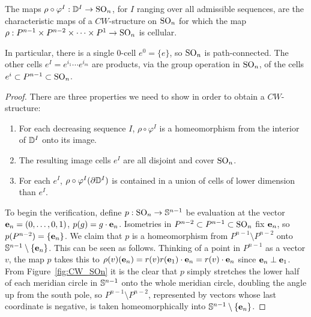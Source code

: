 \begin{prop}\label{prop 3D.1 Hatcher}
    The maps $\rho\circ \varphi^I:\bbD^I\to \SO_n$, for $I$ ranging over all admissible sequences, are the characteristic maps of a $CW$-structure on $\SO_n$ for which the map $\rho:P^{n-1}\times P^{n-2}\times \cdots\times P^1\to \SO_n$ is cellular. 
    
    In particular, there is a single 0-cell $e^0=\{e\}$, so $\SO_n$ is path-connected. The other cells $e^I=e^{i_1}\cdots e^{i_m}$ are products, via the group operation in $\SO_n$, of the cells $e^i\subset P^{n-1}\subset \SO_n$.
\end{prop}
\begin{proof}
    There are three properties we need to show in order to obtain a $CW$-structure:
    \begin{enumerate}[label=(\arabic*)]
        \item For each decreasing sequence $I$, $\rho\circ \varphi^I$ is a homeomorphism from the interior of $\bbD^I$ onto its image.
        \item The resulting image cells $e^I$ are all disjoint and cover $\SO_n$.
        \item For each $e^I$, $\rho\circ\varphi^I(\partial \bbD^I)$ is contained in a union of cells of lower dimension than $e^I$.
    \end{enumerate}
    To begin the verification, define $p:\SO_n\to \bbS^{n-1}$ be evaluation at the vector $\bf{e}_n=(0,\ldots,0,1)$, $p(g)=g\cdot \bf{e}_n$. Isometries in $P^{n-2}\subset P^{n-1}\subset \SO_n$ fix $\bf{e}_n$, so $p(P^{n-2})=\{\bf{e}_n\}$. We claim that $p$ is a homeomorphism from $P^{n-1}\setminus P^{n-2}$ onto $\bbS^{n-1}\setminus\{\bf{e}_n\}$. This can be seen as follows. Thinking of a point in $P^{n-1}$ as a vector $v$, the map $p$ takes this to $\rho(v)(\bf{e}_n)=r(v)r(\bf{e}_1)\cdot \bf{e}_n=r(v)\cdot \bf{e}_n$ since $\bf{e}_n\perp \bf{e}_1$. From Figure~\ref{fig:CW_SOn} it is the clear that $p$ simply stretches the lower half of each meridian circle in $\bbS^{n-1}$ onto the whole meridian circle, doubling the angle up from the south pole, so $P^{n-1}\setminus P^{n-2}$, represented by vectors whose last coordinate is negative, is taken homeomorphically into $\bbS^{n-1}\setminus\{\bf{e}_n\}$.


\end{proof}
